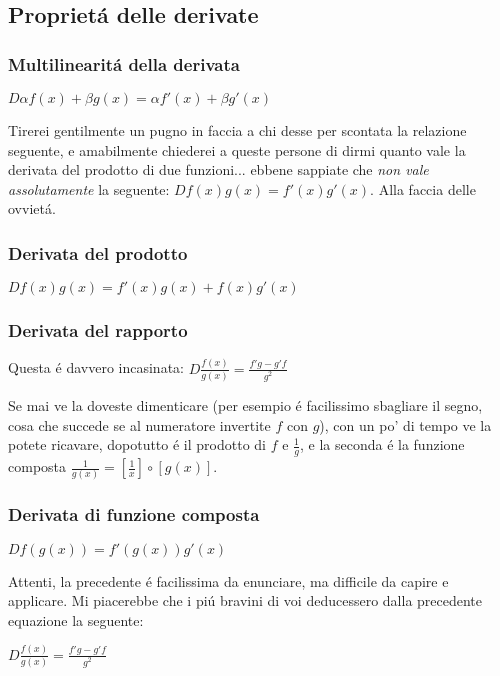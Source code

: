 \subsection{Propriet\'a delle derivate}

\subsubsection{Multilinearit\'a della derivata}

$D \alpha f(x)+\beta g(x) = \alpha f'(x) + \beta g'(x)$

Tirerei gentilmente un pugno in faccia a chi desse per scontata la relazione seguente, e amabilmente chiederei
a queste persone di dirmi quanto vale la derivata del prodotto di due funzioni... ebbene sappiate che
{\em non vale assolutamente} la seguente: $D f(x)g(x) = f'(x)g'(x)$. Alla faccia delle ovviet\'a.
\subsubsection{Derivata del prodotto}

$D  f(x)g(x) = f'(x)g(x) + f(x) g'(x)$

\subsubsection{Derivata del rapporto}

Questa \'e davvero incasinata:
$D  \frac{f(x)}{g(x)} = \frac{f'g-g'f}{g^2}$

Se mai ve la doveste dimenticare (per esempio \'e facilissimo sbagliare il segno, cosa che succede se al numeratore invertite $f$ con $g$), con un po' di tempo ve la potete ricavare, dopotutto \'e il prodotto di $f$ e $\frac{1}{g}$, e la seconda \'e la funzione composta $\frac{1}{g(x)}=[\frac{1}{x}]\circ[g(x)]$. 

\subsubsection{Derivata di funzione composta}
$D f(g(x)) = f'(g(x))g'(x)$

Attenti, la precedente \'e facilissima da enunciare, ma difficile da capire e applicare. Mi piacerebbe che i pi\'u bravini di voi deducessero dalla precedente equazione la seguente: 

$D \frac{f(x)}{g(x)} = \frac{f'g-g'f}{g^2}$

